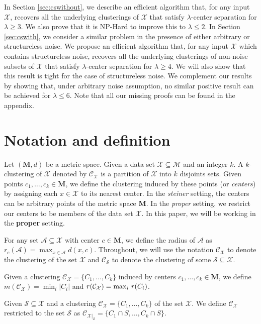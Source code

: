 \documentclass[orivec]{llncs}
\newcommand{\mc}{\mathcal}
\newcommand{\mb}{\mathbf}
\begin{document}
In Section \ref{sec:cswithout}, we describe an efficient algorithm that, for any input $\mc X$, recovers all the underlying clusterings of $\mc X$ that satisfy $\lambda$-center separation for $\lambda \geq 3$. We also prove that it is NP-Hard to improve this to $\lambda \leq 2$. In Section \ref{sec:cswith}, we consider a similar problem in the presence of either arbitrary or structureless noise. We propose an efficient algorithm that, for any input $\mc X$ which contains structureless noise, recovers all the underlying clusterings of non-noise subsets of $\mc X$ that satisfy $\lambda$-center separation for $\lambda \geq 4$. We will also show that this result is tight for the case of structureless noise. We complement our results by showing that, under arbitrary noise assumption, no similar positive result can be achieved for $\lambda \leq 6$. Note that all our missing proofs can be found in the appendix.

\section{Notation and definition}
\label{sec:Notation}
Let $(\mb M, d)$ be a metric space. Given a data set $\mc X \subseteq \mc M$ and an integer $k$. A $k$-clustering of $\mc X$ denoted by $\mc C_{\mc X}$ is a partition of $\mc X$ into $k$ disjoints sets. Given points $c_1, \ldots, c_k \in \mb M$, we define the clustering induced by these points (or {\it centers}) by assigning each $x \in \mc X$ to its nearest center. In the {\it steiner} setting, the centers can be arbitrary points of the metric space $\mb M$. In the {\it proper} setting, we restrict our centers to be members of the data set $\mc X$. In this paper, we will be working in the {\bf proper} setting.

For any set $\mc A\subseteq \mc X$ with center $c\in \mb M$, we define the radius of $\mc A$ as $r_c(\mc A) = \max_{x \in \mc A} d(x, c)$. Throughout, we will use the notation $\mc C_{\mc X}$ to denote the clustering of the set $\mc X$ and $\mc C_{\mc S}$ to denote the clustering of some $\mc S\subseteq \mc X$. 

\begin{definition}[$r(\mc C_{\mc X})$ , $m(\mc C_{\mc X})$] Given a clustering $\mc C_{\mc X} = \{C_1, \ldots, C_k\}$ induced by centers $c_1, \ldots, c_k \in \mb M$, we define $m(\mc{C}_{\mc{X}}) = \min_i |C_i|$ and $r(\mc{C}_{\mc{X}}) = \max_i \thinspace r(C_i)$.
\end{definition}

\begin{definition}[$\mc C_{\mc X}$ restricted to a set] Given $\mc S \subseteq \mc X$ and a clustering $\mc C_{\mc X} = \{C_1, \ldots, C_k\}$ of the set $\mc X$. We define $\mc C_{\mc X}$ restricted to the set $\mc S$ as $\mc C_{{\mc X}|_{\mc S}} = \{C_1 \cap S, \ldots, C_k \cap S\}$. 
\end{definition}
\end{document}
